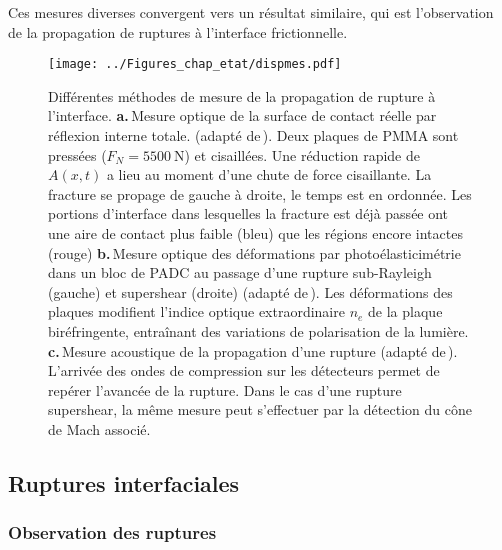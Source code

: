Ces mesures diverses convergent vers un résultat similaire, qui est l'observation de la propagation de ruptures à l'interface frictionnelle.




\begin{figure}[p!]
\centering
\texttt{[image: ../Figures\_chap\_etat/dispmes.pdf]}
\caption[Présentations des différentes mesures]{Différentes méthodes de mesure de la propagation de rupture à l'interface. \textbf{a.}\,Mesure optique de la surface de contact réelle par réflexion interne totale.  (adapté de\,\cite{svetlizky_brittle_2019}). Deux plaques de PMMA sont pressées ($F_N=\SI{5500}{\newton}$) et cisaillées. Une réduction rapide de $A(x, t)$ a lieu au moment d'une chute de force cisaillante. La fracture se propage de gauche à droite, le temps est en ordonnée. Les portions d'interface dans lesquelles la fracture est déjà passée ont une aire de contact plus faible (bleu) que les régions encore intactes (rouge) \textbf{b.}\,Mesure optique des déformations par photoélasticimétrie dans un bloc de PADC au passage d'une rupture sub-Rayleigh (gauche) et supershear (droite) (adapté de\,\cite{xia_laboratory_2004}). Les déformations des plaques modifient l'indice optique extraordinaire $n_e$ de la plaque biréfringente, entraînant des variations de polarisation de la lumière. \textbf{c.}\,Mesure acoustique de la propagation d'une rupture (adapté de\,\cite{passelegue_sub-rayleigh_2013}). L'arrivée des ondes de compression sur les détecteurs permet de repérer l'avancée de la rupture. Dans le cas d'une rupture supershear, la même mesure peut s'effectuer par la détection du cône de Mach associé.}
\label{fig:dispmes}
\end{figure}

\subsection{Ruptures interfaciales}

\subsubsection{Observation des ruptures}



